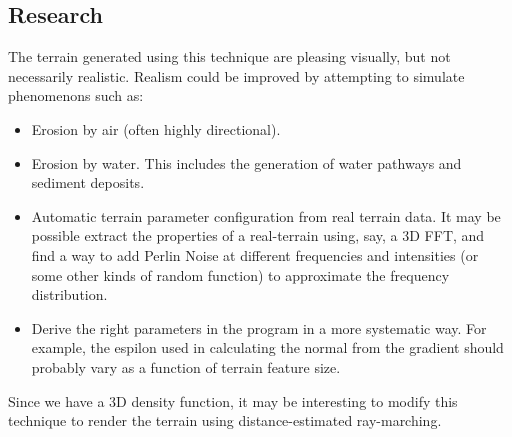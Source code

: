 \documentclass {article}
\begin{document}
\subsection{Research}

The terrain generated using this technique are pleasing visually, but not necessarily realistic. Realism could be improved by attempting to simulate phenomenons such as:

\begin{itemize}
\item Erosion by air (often highly directional).
\item Erosion by water. This includes the generation of water pathways and sediment deposits.
\item Automatic terrain parameter configuration from real terrain data. It may be possible extract the properties of a real-terrain using, say, a 3D FFT, and find a way to add Perlin Noise at different frequencies and intensities (or some other kinds of random function) to approximate the frequency distribution.
\item Derive the right parameters in the program in a more systematic way. For example, the espilon used in calculating the normal from the gradient should probably vary as a function of terrain feature size.
\end{itemize}

Since we have a 3D density function, it may be interesting to modify this technique to render the terrain using distance-estimated ray-marching.



\end{document}
